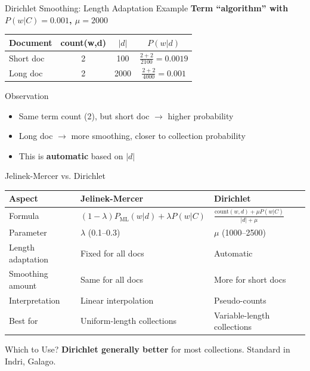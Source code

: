\documentclass[aspectratio=169]{beamer}
\begin{document}
\begin{frame}{Dirichlet Smoothing: Length Adaptation Example}
\textbf{Term ``algorithm'' with $P(w|C) = 0.001$, $\mu = 2000$}

\vspace{1em}

\begin{table}
\centering
\begin{tabular}{lccc}
\toprule
\textbf{Document} & \textbf{count(w,d)} & \textbf{$|d|$} & \textbf{$P(w|d)$} \\
\midrule
Short doc & 2 & 100 & $\frac{2 + 2}{2100} = 0.0019$ \\
Long doc & 2 & 2000 & $\frac{2 + 2}{4000} = 0.001$ \\
\bottomrule
\end{tabular}
\end{table}

\vspace{1em}

\begin{block}{Observation}
\begin{itemize}
    \item Same term count (2), but short doc $\to$ higher probability
    \item Long doc $\to$ more smoothing, closer to collection probability
    \item This is \textbf{automatic} based on $|d|$
\end{itemize}
\end{block}
\end{frame}

\begin{frame}{Jelinek-Mercer vs. Dirichlet}
\begin{table}
\centering
\small
\begin{tabular}{lll}
\toprule
\textbf{Aspect} & \textbf{Jelinek-Mercer} & \textbf{Dirichlet} \\
\midrule
Formula & $(1{-}\lambda) P_{\text{ML}}(w|d) + \lambda P(w|C)$ & $\frac{\text{count}(w,d) + \mu P(w|C)}{|d| + \mu}$ \\
Parameter & $\lambda$ (0.1--0.3) & $\mu$ (1000--2500) \\
Length adaptation & Fixed for all docs & Automatic \\
Smoothing amount & Same for all docs & More for short docs \\
Interpretation & Linear interpolation & Pseudo-counts \\
Best for & Uniform-length collections & Variable-length collections \\
\bottomrule
\end{tabular}
\end{table}

\vspace{1em}

\begin{block}{Which to Use?}
\textbf{Dirichlet generally better} for most collections. Standard in Indri, Galago.
\end{block}
\end{frame}
\end{document}
